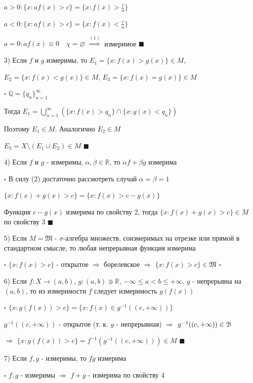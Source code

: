 \documentclass[a4paper]{report}
\begin{document}
$a>0\colon\{x\colon af(x)>c\}=\{x\colon f(x)>\frac{c}{a}\}$

$a<0\colon\{x\colon af(x)>c\}=\{x\colon f(x)<\frac{c}{a}\}$

$a=0\colon af(x)\equiv0\quad\chi=\varnothing$ $\stackrel{(1)}{\Rightarrow}$ измеримое $\blacksquare$
\bigskip

3) Если $f$ и $g$ измеримы, то $E_1=\{x\colon f(x)>g(x)\}\in M$,

$E_2=\{x\colon f(x)<g(x)\}\in M$, $E_3=\{x\colon f(x)=g(x)\}\in M$

\noindent $\square$ $\mathbb Q=\{q_n\}_{n=1}^\infty$

Тогда $E_1=\bigcup\limits_{n=1}^\infty\left(\{x\colon f(x)>q_n\}\cap\{x\colon g(x)<q_n\}\right)$

Поэтому $E_1\in M$. Аналогично $E_2\in M$

$E_3=X\setminus(E_1\cup E_2)\in M$ $\blacksquare$
\bigskip

4) Если $f$ и $g$ - измеримы, $\alpha,\beta\in\mathbb R$, то $\alpha f+\beta g$ измерима

\noindent $\square$ В силу (2) достаточно рассмотреть случай $\alpha=\beta=1$

$\{x\colon f(x)+g(x)>c\}=\{x\colon f(x)>c-g(x)\}$

Функция $c-g(x)$ измерима по свойству 2, тогда $\{x\colon f(x)+g(x)>c\}\in M$ по свойству 3 $\blacksquare$
\bigskip

5) Если $M=\mathfrak M$ - $\sigma$-алгебра множеств, соизмеримых на отрезке или прямой в стандартном смысле, то любая непрерывная функция измерима

\noindent $\square$ $\{x\colon f(x)>c\}$ - открытое $\Rightarrow$ борелевское $\Rightarrow$ $\{x\colon f(x)>c\}\in\mathfrak M$ $\square$
\bigskip

6) Если $f\colon X\to(a,b)$, $g\colon(a,b)\Supset\mathbb R$, $-\infty\le a<b\le+\infty$, $g$ - непрерывна на $(a,b)$, то из измеримости $f$ следует измеримость $g(f(x))$

\noindent $\square$ $\{x\colon g(f(x))>c\}=\{x\colon f(x)\in g^{-1}((c,+\infty))\}$

$g^{-1}((c,+\infty))$ - открытое (т. к. $g$ - непрерывная) $\Rightarrow$ $g^{-1}((c,+\infty))\in\EuScript B$

$\Rightarrow$
$\{x\colon g(f(x))>c\}=f^{-1}\left(g^{-1}((c,+\infty))\right)\in M$ $\blacksquare$
\bigskip

7) Если $f,g$ - измеримы, то $fg$ измерима

\noindent $\square$ $f,g$ - измеримы $\Rightarrow$ $f+g$ - измерима по свойству 4
\end{document}
